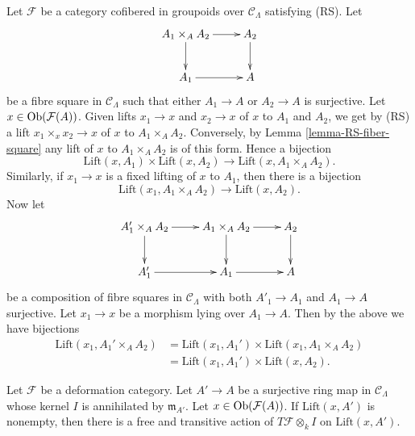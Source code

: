 \begin{remark}
\label{remark-lift-bijections}
Let $\mathcal{F}$ be a category cofibered in groupoids over $\mathcal
C_\Lambda$ satisfying (RS).  Let
$$
\xymatrix{
A_1 \times_A A_2 \ar[r] \ar[d] & A_2 \ar[d] \\
A_1 \ar[r] & A
}
$$
be a fibre square in $\mathcal{C}_\Lambda$ such that either
$A_1 \to A$ or $A_2 \to A$ is surjective. Let
$x \in \mathop{\mathrm{Ob}}\nolimits(\mathcal{F}(A))$. Given
lifts $x_1 \to x$ and $x_2 \to x$ of $x$ to $A_1$ and $A_2$, we get by
(RS) a lift $x_1 \times_x x_2 \to x$ of $x$ to $A_1 \times_A A_2$.
Conversely, by
Lemma \ref{lemma-RS-fiber-square}
any lift of $x$ to $A_1 \times_A A_2$ is of this form.
Hence a bijection
$$
\text{Lift}(x, A_1) \times \text{Lift}(x, A_2)
\longrightarrow
\text{Lift}(x, A_1 \times_A A_2).
$$
Similarly, if $x_1 \to x$ is a fixed lifting of $x$ to $A_1$, then
there is a bijection
$$
\text{Lift}(x_1, A_1 \times_A A_2)
\longrightarrow
\text{Lift}(x, A_2).
$$
Now let
$$
\xymatrix{
A_1' \times_A A_2 \ar[r] \ar[d] & A_1 \times_A A_2 \ar[r] \ar[d] & A_2
\ar[d] \\
A_1' \ar[r] & A_1 \ar[r] & A
}
$$
be a composition of fibre squares in $\mathcal{C}_\Lambda$ with
both $A'_1 \to A_1$ and $A_1 \to A$ surjective. Let $x_1 \to x$ be a morphism
lying over $A_1 \to A$. Then by the above we have bijections
\begin{align*}
\text{Lift}(x_1, A_1' \times_A A_2)
& = \text{Lift}(x_1, A_1') \times \text{Lift}(x_1, A_1 \times_A A_2) \\
& = \text{Lift}(x_1, A_1') \times \text{Lift}(x, A_2).
\end{align*}
\end{remark}

\begin{lemma}
\label{lemma-free-transitive-action}
Let $\mathcal{F}$ be a deformation category.
Let $A' \to A$ be a surjective ring map in
$\mathcal{C}_\Lambda$ whose kernel $I$ is annihilated
by $\mathfrak m_{A'}$. Let $x \in \mathop{\mathrm{Ob}}\nolimits(\mathcal{F}(A))$.
If $\text{Lift}(x, A')$ is nonempty,
then there is a free and transitive action of
$T\mathcal{F} \otimes_k I$ on $\text{Lift}(x, A')$.
\end{lemma}

